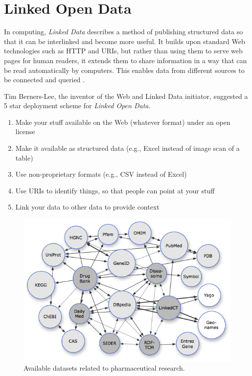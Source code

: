 \documentclass[10pt, conference, compsocconf]{IEEEtran}
\begin{document}
\section{Linked Open Data}
\label{sec:lod}
In computing, \emph{Linked Data} describes a method of publishing structured data so that it can be interlinked and become more useful.
It builds upon standard Web technologies such as HTTP and URIs, but rather than using them to serve web pages for human readers, it extends them to share information in a way that can be read automatically by computers.
This enables data from different sources to be connected and queried \cite{linkeddata}.

Tim Berners-Lee, the inventor of the Web and Linked Data initiator, suggested a 5 star deployment scheme for \emph{Linked Open Data}.

\begin{enumerate}
  \item  Make your stuff available on the Web (whatever format) under an open license
  \item  Make it available as structured data (e.g., Excel instead of image scan of a table)
  \item  Use non-proprietary formats (e.g., CSV instead of Excel)
  \item  Use URIs to identify things, so that people can point at your stuff
  \item  Link your data to other data to provide context
\end{enumerate}

\begin{figure}[tb]
	\centering
		\includegraphics[width=1.0\columnwidth]{images/lod_cloud.png}
	\caption{Available datasets related to pharmaceutical research.}
	\label{fig:lod}
\end{figure}
\end{document}
